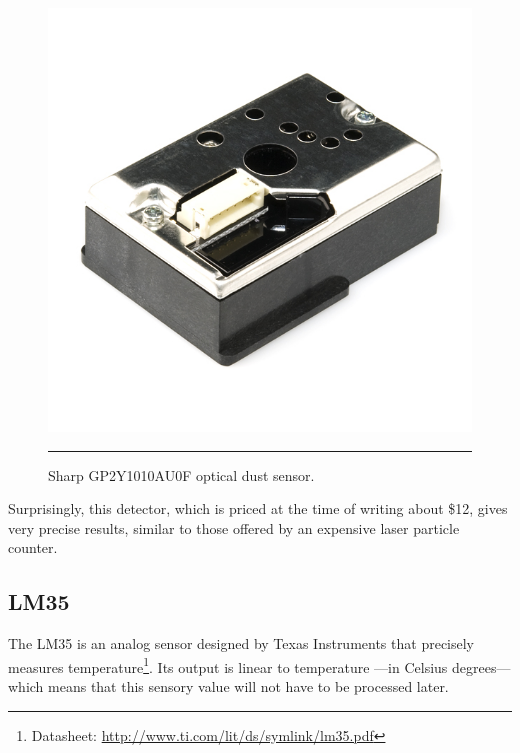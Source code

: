 \begin{figure}[htbp]
    \centering
        \includegraphics{./Figures/sharp.jpg}
        \rule{35em}{0.5pt}
    \caption[Sharp GP2Y1010AU0F]{Sharp GP2Y1010AU0F optical dust sensor.}
    \label{fig:SharpGP2Y1010AU0F}
\end{figure}

Surprisingly, this detector, which is priced at the time of writing about \$12, gives very precise results, similar to those offered by an expensive laser particle counter\cite{airquality}.


\subsection{LM35}
\label{sub:lm35}

The LM35 is an analog sensor designed by Texas Instruments that precisely measures temperature\footnote{Datasheet: \url{http://www.ti.com/lit/ds/symlink/lm35.pdf}}. Its output is linear to temperature ---in Celsius degrees--- which means that this sensory value will not have to be processed later.

